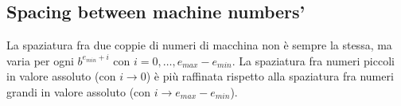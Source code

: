 \subsection{Spacing between machine numbers'}
La spaziatura fra due coppie di numeri di macchina non \`e sempre la stessa, ma
varia per ogni $b^{e_{min} + i}$ con $i = 0, \ldots, e_{max} - e_{min}$.
La spaziatura fra numeri piccoli in valore assoluto (con $i \rightarrow 0$)
\`e pi\`u raffinata rispetto alla spaziatura fra numeri grandi in valore
assoluto (con $i \rightarrow e_{max} - e_{min}$).
